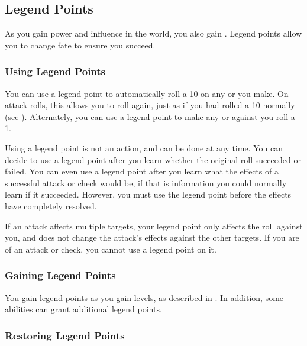     \subsection{Legend Points}\label{Legend Points}

        As you gain power and influence in the world, you also gain .
        Legend points allow you to change fate to ensure you succeed.

        \subsubsection{Using Legend Points}
            You can use a legend point to automatically roll a 10 on any  or  you make.
            On attack rolls, this allows you to roll again, just as if you had rolled a 10 normally (see ).
            Alternately, you can use a legend point to make any  or  against you roll a 1.

            Using a legend point is not an action, and can be done at any time.
            You can decide to use a legend point after you learn whether the original roll succeeded or failed.
            You can even use a legend point after you learn what the effects of a successful attack or check would be, if that is information you could normally learn if it succeeded.
            However, you must use the legend point before the effects have completely resolved.

            If an attack affects multiple targets, your legend point only affects the roll against you, and does not change the attack's effects against the other targets.
            If you are  of an attack or check, you cannot use a legend point on it.

        \subsubsection{Gaining Legend Points}

            You gain legend points as you gain levels, as described in .
            In addition, some abilities can grant additional legend points.

        \subsubsection{Restoring Legend Points}

